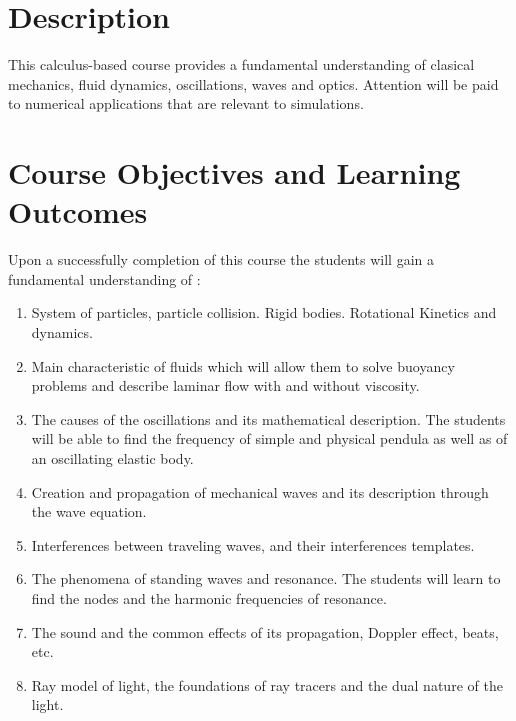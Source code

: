 \documentclass[12pt]{article}
\begin{document}



\section*{Description}

This calculus-based course provides a fundamental understanding of 
clasical mechanics, fluid dynamics, oscillations, waves and optics. 
Attention will be paid to numerical applications that are relevant to simulations.  




\section*{Course Objectives and Learning Outcomes }
Upon a successfully completion of this course the students will gain a fundamental understanding of :

\begin{enumerate}
\item System of particles, particle collision. Rigid bodies. Rotational Kinetics and dynamics.
\item  Main characteristic of fluids which will allow them to solve buoyancy problems and describe laminar flow with and without viscosity.
\item  The causes of the oscillations and its mathematical description. The students will be able to find the frequency of simple and physical pendula 
as well as of an oscillating elastic body.
\item  Creation and propagation of mechanical waves and its description through the wave equation.
\item  Interferences between traveling waves, and their interferences templates. 
\item  The phenomena of standing waves and resonance. The students will learn to find the nodes and the harmonic frequencies of resonance. 
\item The sound and the common effects of its propagation, Doppler effect, beats, etc.
\item  Ray model of light, the foundations of ray tracers and the dual nature of the light.

\end{enumerate}
\end{document}
